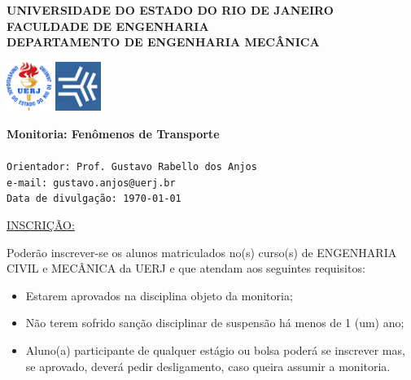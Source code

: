 \documentclass[a4paper,portuguese,12pt]{article}
\begin{document}
\thispagestyle{empty}

\begin{minipage}{0.72\linewidth}
	\normalsize\textbf{UNIVERSIDADE DO ESTADO DO RIO DE JANEIRO\\
	              FACULDADE DE ENGENHARIA\\
				  DEPARTAMENTO DE ENGENHARIA MECÂNICA}
\end{minipage}
\begin{minipage}{0.27\linewidth}
	\flushright
	\includegraphics[height=16mm]{figs/logouerj.jpg}
	\hspace{.5cm}
	\includegraphics[height=16mm]{figs/fen.png}
\end{minipage}

\hrulefill

\Large \color{NavyBlue} \textbf{Monitoria: Fenômenos de Transporte}\\
\color{Black}\\ 
\normalsize \texttt{Orientador: Prof. Gustavo Rabello dos Anjos}\\
\normalsize \texttt{e-mail: gustavo.anjos@uerj.br}\\
\normalsize \texttt{Data de divulgação: \today}

\vspace{1cm}

\underline{INSCRIÇÃO:}

Poderão inscrever-se os alunos matriculados no(s) curso(s) de ENGENHARIA
CIVIL e MECÂNICA da UERJ e que atendam aos seguintes requisitos:

\begin{itemize}
	\item Estarem aprovados na disciplina objeto da monitoria;
	\item Não terem sofrido sanção disciplinar de suspensão há menos de
	1 (um) ano;
	\item Aluno(a) participante de qualquer estágio ou bolsa poderá se
	inscrever mas, se aprovado, deverá pedir desligamento, caso queira
	assumir a monitoria.
\end{itemize}
\end{document}
